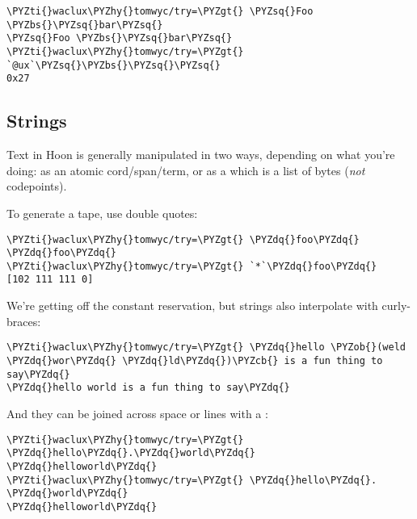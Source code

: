\begin{framed_shaded}
\begin{Verbatim}[fontsize=\relsize{-2.5},fontseries=b,commandchars=\\\{\}]
\PYZti{}waclux\PYZhy{}tomwyc/try=\PYZgt{} \PYZsq{}Foo \PYZbs{}\PYZsq{}bar\PYZsq{}
\PYZsq{}Foo \PYZbs{}\PYZsq{}bar\PYZsq{}
\PYZti{}waclux\PYZhy{}tomwyc/try=\PYZgt{} `@ux`\PYZsq{}\PYZbs{}\PYZsq{}\PYZsq{}
0x27
\end{Verbatim}
\end{framed_shaded}

\subsection{Strings}

Text in Hoon is generally manipulated in two ways, depending on
what you're doing: as an atomic cord/span/term, or as a 
which is a list of bytes (\emph{not} codepoints).

To generate a tape, use double quotes:

\begin{framed_shaded}
\begin{Verbatim}[fontsize=\relsize{-2.5},fontseries=b,commandchars=\\\{\}]
\PYZti{}waclux\PYZhy{}tomwyc/try=\PYZgt{} \PYZdq{}foo\PYZdq{}
\PYZdq{}foo\PYZdq{}
\PYZti{}waclux\PYZhy{}tomwyc/try=\PYZgt{} `*`\PYZdq{}foo\PYZdq{}
[102 111 111 0]
\end{Verbatim}
\end{framed_shaded}
We're getting off the constant reservation, but strings also
interpolate with curly-braces:

\begin{framed_shaded}
\begin{Verbatim}[fontsize=\relsize{-2.5},fontseries=b,commandchars=\\\{\}]
\PYZti{}waclux\PYZhy{}tomwyc/try=\PYZgt{} \PYZdq{}hello \PYZob{}(weld \PYZdq{}wor\PYZdq{} \PYZdq{}ld\PYZdq{})\PYZcb{} is a fun thing to say\PYZdq{}
\PYZdq{}hello world is a fun thing to say\PYZdq{}
\end{Verbatim}
\end{framed_shaded}
And they can be joined across space or lines with a :

\begin{framed_shaded}
\begin{Verbatim}[fontsize=\relsize{-2.5},fontseries=b,commandchars=\\\{\}]
\PYZti{}waclux\PYZhy{}tomwyc/try=\PYZgt{} \PYZdq{}hello\PYZdq{}.\PYZdq{}world\PYZdq{}
\PYZdq{}helloworld\PYZdq{}
\PYZti{}waclux\PYZhy{}tomwyc/try=\PYZgt{} \PYZdq{}hello\PYZdq{}. \PYZdq{}world\PYZdq{}
\PYZdq{}helloworld\PYZdq{}
\end{Verbatim}
\end{framed_shaded}